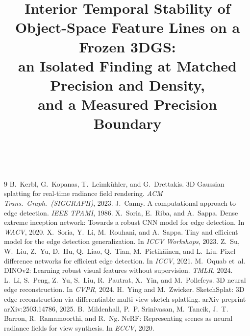 \documentclass[conference]{IEEEtran}
\begin{document}
\title{Interior Temporal Stability of Object-Space Feature Lines on a Frozen 3DGS:\\
an Isolated Finding at Matched Precision and Density,\\ and a Measured Precision Boundary}

\author{\\
}

\maketitle

\begin{abstract}

\end{abstract}



\clearpage
\begin{thebibliography}{9}
 B.~Kerbl, G.~Kopanas, T.~Leimk\"uhler, and G.~Drettakis.
3D Gaussian splatting for real-time radiance field rendering.
\emph{ACM Trans.\ Graph.\ (SIGGRAPH)}, 2023.
 J.~Canny. A computational approach to edge detection.
\emph{IEEE TPAMI}, 1986.
 X.~Soria, E.~Riba, and A.~Sappa. Dense extreme inception network:
Towards a robust CNN model for edge detection. In \emph{WACV}, 2020.
 X.~Soria, Y.~Li, M.~Rouhani, and A.~Sappa. Tiny and efficient model for
the edge detection generalization. In \emph{ICCV Workshops}, 2023.
 Z.~Su, W.~Liu, Z.~Yu, D.~Hu, Q.~Liao, Q.~Tian, M.~Pietik\"ainen, and
L.~Liu. Pixel difference networks for efficient edge detection. In \emph{ICCV}, 2021.
 M.~Oquab et~al. DINOv2: Learning robust visual features without
supervision. \emph{TMLR}, 2024.
 L.~Li, S.~Peng, Z.~Yu, S.~Liu, R.~Pautrat, X.~Yin, and M.~Pollefeys.
3D neural edge reconstruction. In \emph{CVPR}, 2024.
 H.~Ying and M.~Zwicker. SketchSplat: 3D edge reconstruction via differentiable multi-view sketch splatting. arXiv preprint arXiv:2503.14786, 2025.
 B.~Mildenhall, P.~P. Srinivasan, M.~Tancik, J.~T. Barron,
R.~Ramamoorthi, and R.~Ng. NeRF: Representing scenes as neural radiance fields for view
synthesis. In \emph{ECCV}, 2020.
\end{thebibliography}



\clearpage

\end{document}

